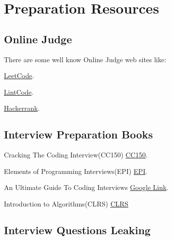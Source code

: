 \chapter{Preparation Resources}




\section{Online Judge }

There are some well know Online Judge web sites like:

 
\href{http://leetcode.com/problemset/}{LeetCode}. 
 
\href{http://www.lintcode.com/en/problem/}{LintCode}. 

\href{http://www.hackerrank.com/}{Hackerrank}. 

\section{Interview Preparation Books }

Cracking The Coding Interview(CC150)
\href{http://www.amazon.com/Cracking-Coding-Interview-Programming-Questions/dp/098478280X}{CC150}. 

Elements of Programming Interviews(EPI)
\href{http://www.amazon.com/Elements-Programming-Interviews-Insiders-Guide/dp/1479274836}{EPI}.

An Ultimate Guide To Coding Interviews
\href{https://play.google.com/store/books/details?id=XDoVCAAAQBAJ&rdid=book-XDoVCAAAQBAJ&rdot=1&source=gbs_vpt_read&pcampaignid=books_booksearch_viewport}{Google Link}.

Introduction to Algorithms(CLRS)
\href{http://mitpress.mit.edu/books/introduction-algorithms}{CLRS}



\section{Interview Questions Leaking }
 